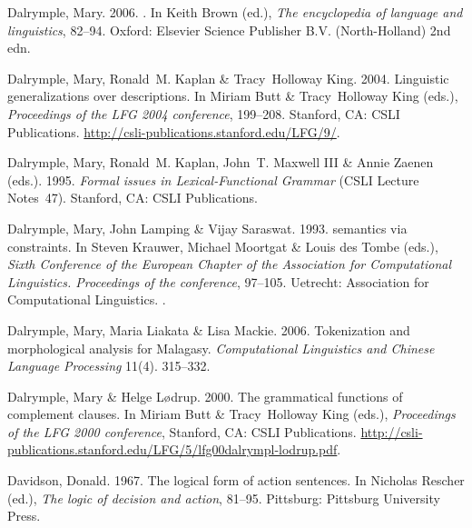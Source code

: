 \begin{thebibliography}{1420}
Dalrymple, Mary. 2006.
.
\newblock In Keith Brown (ed.), \emph{The encyclopedia of language and
  linguistics}, 82--94. Oxford: Elsevier Science Publisher B.V. (North-Holland)
  2nd edn.

Dalrymple, Mary, Ronald~M. Kaplan \& Tracy~Holloway King. 2004.
\newblock Linguistic generalizations over descriptions.
\newblock In Miriam Butt \& Tracy~Holloway King (eds.), \emph{Proceedings of
  the {LFG 2004} conference}, 199--208. Stanford, CA: CSLI Publications.
\newblock \urlprefix\url{http://csli-publications.stanford.edu/LFG/9/}.

Dalrymple, Mary, Ronald~M. Kaplan, John~T. {Maxwell III} \& Annie Zaenen
  (eds.). 1995.
\newblock \emph{Formal issues in {Lexical-Functional Grammar}} (CSLI Lecture
  Notes~47).
\newblock Stanford, CA: CSLI Publications.

Dalrymple, Mary, John Lamping \& Vijay Saraswat. 1993.
 semantics via constraints.
\newblock In Steven Krauwer, Michael Moortgat \& Louis des Tombe (eds.),
  \emph{{Sixth Conference of the European Chapter of the Association for
  Computational Linguistics. Proceedings} of the conference}, 97--105.
  Uetrecht: Association for Computational Linguistics.
\newblock {}.

Dalrymple, Mary, Maria Liakata \& Lisa Mackie. 2006.
\newblock Tokenization and morphological analysis for {Malagasy}.
\newblock \emph{Computational Linguistics and {Chinese} Language Processing}
  11(4). 315--332.

Dalrymple, Mary \& Helge L{\o}drup. 2000.
\newblock The grammatical functions of complement clauses.
\newblock In Miriam Butt \& Tracy~Holloway King (eds.), \emph{Proceedings of
  the {LFG 2000} conference}, Stanford, CA: CSLI Publications.
\newblock
  \urlprefix\url{http://csli-publications.stanford.edu/LFG/5/lfg00dalrympl-lodrup.pdf}.

Davidson, Donald. 1967.
\newblock The logical form of action sentences.
\newblock In Nicholas Rescher (ed.), \emph{The logic of decision and action},
  81--95. Pittsburg: Pittsburg University Press.


\end{thebibliography}
